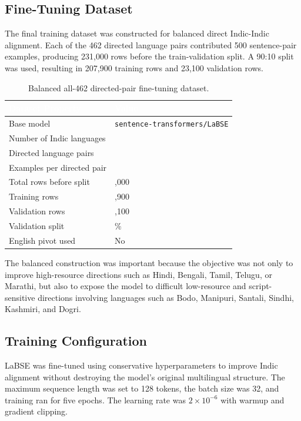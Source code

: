 \documentclass[12pt, a4paper]{article}
\begin{document}
\subsection{Fine-Tuning Dataset}

The final training dataset was constructed for balanced direct Indic-Indic alignment. Each of the 462 directed language pairs contributed 500 sentence-pair examples, producing 231,000 rows before the train-validation split. A 90:10 split was used, resulting in 207,900 training rows and 23,100 validation rows.

\begin{table}[H]
\centering
\renewcommand{\arraystretch}{1.25}
\begin{tabular}{>{\raggedright\arraybackslash}p{6.5cm} >{\raggedright\arraybackslash}p{6cm}}
\toprule
\rowcolor{headerblue}
\textcolor{white}{\textbf{Dataset Property}} & \textcolor{white}{\textbf{Value}} \\
\midrule
\rowcolor{rowgray}
Base model & \texttt{sentence-transformers/LaBSE} \\
Number of Indic languages & 22 \\
\rowcolor{rowgray}
Directed language pairs & 462 \\
Examples per directed pair & 500 \\
\rowcolor{rowgray}
Total rows before split & 231,000 \\
Training rows & 207,900 \\
\rowcolor{rowgray}
Validation rows & 23,100 \\
Validation split & 10\% \\
\rowcolor{rowgray}
English pivot used & No \\
\bottomrule
\end{tabular}
\caption{Balanced all-462 directed-pair fine-tuning dataset.}
\label{tab:dataset}
\end{table}

The balanced construction was important because the objective was not only to improve high-resource directions such as Hindi, Bengali, Tamil, Telugu, or Marathi, but also to expose the model to difficult low-resource and script-sensitive directions involving languages such as Bodo, Manipuri, Santali, Sindhi, Kashmiri, and Dogri.

\subsection{Training Configuration}

LaBSE was fine-tuned using conservative hyperparameters to improve Indic alignment without destroying the model's original multilingual structure. The maximum sequence length was set to 128 tokens, the batch size was 32, and training ran for five epochs. The learning rate was $2 \times 10^{-6}$ with warmup and gradient clipping.
\end{document}
